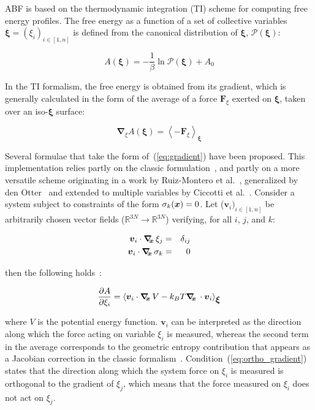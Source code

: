 ABF is based on the thermodynamic integration (TI) scheme for
computing free energy profiles. The free energy as a function
of a set of collective variables $\bm{\xi}=(\xi_{i})_{i\in[1,n]}$
is defined from the canonical distribution of $\bm{\xi}$, ${\mathcal P}(\bm{\xi})$:

\begin{equation}
  \label{eq:free}
  A(\bm{\xi}) = -\frac{1}{\beta} \ln {\mathcal P}(\bm{\xi}) + A_0
\end{equation}

In the TI formalism, the free energy is obtained from its gradient, 
which is generally calculated in the form of the average of a force
$\bm{F}_\xi$ exerted on $\bm{\xi}$, taken over an iso-$\bm{\xi}$ surface:

\begin{equation}
  \label{eq:gradient}
  \bm{\nabla}_\xi A(\bm{\xi}) = \left\langle -\bm{F}_\xi \right\rangle_\bm{\xi}
\end{equation}

Several formulae that take the form of~(\ref{eq:gradient}) have been
proposed.  This implementation relies partly on the classic
formulation~\cite{Carter1989}, and partly on a more versatile scheme
originating in a work by Ruiz-Montero et al.~\cite{Ruiz-Montero1997},
generalized by den Otter~\cite{denOtter2000} and extended to multiple
variables by Ciccotti et al.~\cite{Ciccotti2005}.  Consider a system
subject to constraints of the form $\sigma_{k}({\mbox{\boldmath{$x$}}}) = 0$.  Let
($\bm{v}_{i})_{i\in[1,n]}$ be arbitrarily chosen vector fields
($\mathbb{R}^{3N}\rightarrow\mathbb{R}^{3N}$) verifying, for all $i$,
$j$, and $k$:

\begin{eqnarray}
\label{eq:ortho_gradient}
{\mbox{\boldmath{$v$}}}_{i} \cdot \mbox{\boldmath$\nabla_{\!\!x}\,$} \xi_{j}    & = & \delta_{ij}\\
\label{eq:ortho_constraints}
{\mbox{\boldmath{$v$}}}_{i} \cdot \mbox{\boldmath$\nabla_{\!\!x}\,$} \sigma_{k} & = & 0
\end{eqnarray}

then the following holds~\cite{Ciccotti2005}:

\begin{equation}
\label{eq:gradient_vector}
\frac{\partial A}{\partial \xi_{i}} = \left\langle {\mbox{\boldmath{$v$}}}_{i} \cdot \mbox{\boldmath$\nabla_{\!\!x}\,$} V
- k_B T \mbox{\boldmath$\nabla_{\!\!x}\,$} \cdot {\mbox{\boldmath{$v$}}}_{i} \right\rangle_{\mbox{\boldmath{$\xi$}}}
\end{equation}

where $V$ is the potential energy function.
$\bm{v}_{i}$ can be interpreted as the direction along which the force
acting on variable $\xi_{i}$ is measured, whereas the second term in the
average corresponds to the geometric entropy contribution that appears
as a Jacobian correction in the classic formalism~\cite{Carter1989}.
Condition~(\ref{eq:ortho_gradient}) states that the direction along
which the system force on $\xi_{i}$ is measured is orthogonal to the
gradient of $\xi_{j}$, which means that the force measured on $\xi_{i}$
does not act on $\xi_{j}$.


